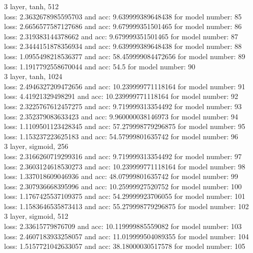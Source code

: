 \documentclass{article}
\begin{document}
3 layer, tanh, 512 \\
loss: 2.3632678985595703 and acc: 9.639999389648438 for model number: 85 \\
loss: 2.6656577587127686 and acc: 9.679999351501465 for model number: 86 \\
loss: 2.319383144378662 and acc: 9.679999351501465 for model number: 87 \\
loss: 2.3444151878356934 and acc: 9.639999389648438 for model number: 88 \\
loss: 1.0955498218536377 and acc: 58.459999084472656 for model number: 89 \\
loss: 1.1917792558670044 and acc: 54.5 for model number: 90 \\
3 layer, tanh, 1024 \\
loss: 2.4946327209472656 and acc: 10.239999771118164 for model number: 91 \\
loss: 4.41921329498291 and acc: 10.239999771118164 for model number: 92 \\
loss: 2.3225767612457275 and acc: 9.719999313354492 for model number: 93 \\
loss: 2.352379083633423 and acc: 9.960000038146973 for model number: 94 \\
loss: 1.1109501123428345 and acc: 57.279998779296875 for model number: 95 \\
loss: 1.153237223625183 and acc: 54.57999801635742 for model number: 96 \\
3 layer, sigmoid, 256 \\
loss: 2.3166260719299316 and acc: 9.719999313354492 for model number: 97 \\
loss: 2.3603124618530273 and acc: 10.239999771118164 for model number: 98 \\
loss: 1.337018609046936 and acc: 48.07999801635742 for model number: 99 \\
loss: 2.307936668395996 and acc: 10.25999927520752 for model number: 100 \\
loss: 1.1767425537109375 and acc: 54.29999923706055 for model number: 101 \\
loss: 1.1583646535873413 and acc: 55.279998779296875 for model number: 102 \\
3 layer, sigmoid, 512 \\
loss: 2.33615779876709 and acc: 10.119999885559082 for model number: 103 \\
loss: 2.4607183933258057 and acc: 11.019999504089355 for model number: 104 \\
loss: 1.5157721042633057 and acc: 38.18000030517578 for model number: 105 \\
\end{document}
